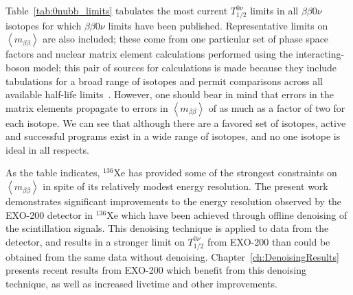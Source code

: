 Table~\ref{tab:0nubb_limits} tabulates the most current $T_{1/2}^{0\nu}$ limits in all $\beta\beta 0\nu$ isotopes for which $\beta\beta 0\nu$ limits have been published.  Representative limits on $\left< m_{\beta\beta}\right>$ are also included; these come from one particular set of phase space factors and nuclear matrix element calculations performed using the interacting-boson model; this pair of sources for calculations is made because they include tabulations for a broad range of isotopes and permit comparisons across all available half-life limits~\cite{PhysRevC.85.034316,PhysRevLett.109.042501}.  However, one should bear in mind that errors in the matrix elements propagate to errors in $\left< m_{\beta\beta}\right>$ of as much as a factor of two for each isotope.  We can see that although there are a favored set of isotopes, active and successful programs exist in a wide range of isotopes, and no one isotope is ideal in all respects.

As the table indicates, $^{136}$Xe has provided some of the strongest constraints on $\left< m_{\beta\beta}\right>$ in spite of its relatively modest energy resolution.  The present work demonstrates significant improvements to the energy resolution observed by the EXO-200 detector in $^{136}$Xe which have been achieved through offline denoising of the scintillation signals.  This denoising technique is applied to data from the detector, and results in a stronger limit on $T_{1/2}^{0\nu}$ from EXO-200 than could be obtained from the same data without denoising.  Chapter~\ref{ch:DenoisingResults} presents recent results from EXO-200 which benefit from this denoising technique, as well as increased livetime and other improvements.
